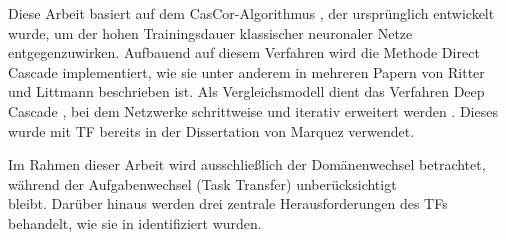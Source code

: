 Diese Arbeit basiert auf dem CasCor-Algorithmus \cite{cascor}, der ursprünglich entwickelt wurde, um der hohen 
Trainingsdauer klassischer neuronaler Netze entgegenzuwirken. Aufbauend auf diesem Verfahren wird die Methode Direct Cascade implementiert, 
wie sie unter anderem in mehreren Papern von Ritter und Littmann \cite{cascade_llm_networks,cascade_network_architectures} beschrieben ist. 
Als Vergleichsmodell dient das Verfahren Deep Cascade \cite{deep_cascade_learning}, bei dem 
Netzwerke schrittweise und iterativ erweitert werden \cite{Constructive_Cascade}. Dieses wurde mit TF bereits in der Dissertation 
von Marquez \cite{phd_deep_cascade} verwendet. 

Im Rahmen dieser Arbeit wird ausschließlich der Domänenwechsel betrachtet, während der Aufgabenwechsel (Task Transfer) \cite{transfer_learning} 
unberücksichtigt \\bleibt. Darüber hinaus werden drei zentrale Herausforderungen des TFs behandelt, wie sie in \cite{survey_transfer} 
identifiziert wurden.
\newline
